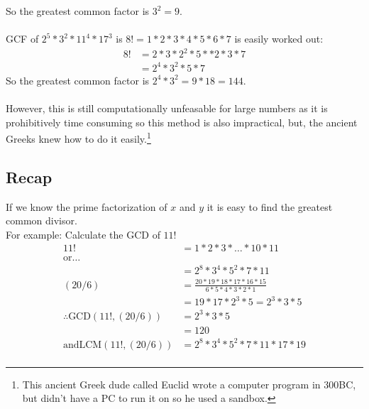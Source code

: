 So the greatest common factor is $3^2 = 9$.\\
\\
GCF of $2^5 * 3^2 * 11^4 * 17^3$ is $8! = 1*2*3*4*5*6*7$ is easily worked out:
\begin{align}
  8! & = 2* 3 * 2^2 * 5 * *2 * 3* 7 \\
     & = 2^4 * 3^2 * 5 * 7
\end{align}
So the greatest common factor is $2^4 * 3^2 = 9 * 18 = 144$.\\
\\
However, this is still computationally unfeasable for large numbers as it is
prohibitively time consuming so this method is also impractical, but, the
ancient Greeks knew how to do it easily.\footnote{This ancient Greek dude called
Euclid wrote a computer program in 300BC, but didn't have a PC to run it on so
he used a sandbox.}

\subsection{Recap}
If we know the prime factorization of $x$ and $y$ it is easy to find the
greatest common divisor.
\\
For example:
Calculate the GCD of $11!$
\begin{align}
     11! & = 1 * 2 * 3 * \ldots * 10 * 11 \\
  \text{or\ldots} & \\
         & = 2^8 * 3^4 * 5^2 * 7 * 11 \\
  (20/6) & = \frac{20* 19 * 18 * 17 * 16 * 15}{6 * 5* 4 * 3 * 2 * 1} \\
         & = 19 * 17 * 2^3 * 5 = 2^3 * 3 * 5 \\
  \therefore \text{GCD}(11!, (20/6)) &= 2^3 * 3 * 5 \\
         & = 120 \\
  \text{and} \text{LCM}(11!, (20/6)) & = 2^8 * 3^4 * 5^2 * 7 * 11 * 17 * 19 \\
\end{align}

